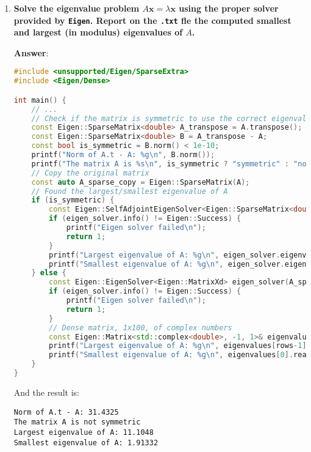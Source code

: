\begin{enumerate}[label=\textcolor{Green3}{\textbf{\arabic*.}}]
    \newpage

    \item \textcolor{Green3}{\textbf{%
        Solve the eigenvalue problem $A\mathbf{x} = \lambda\mathbf{x}$ using the proper solver provided by \texttt{Eigen}. Report on the \texttt{.txt} fle the computed smallest and largest (in modulus) eigenvalues of $A$.
    }}

    \textbf{Answer}:
    \begin{lstlisting}[language=C++]
#include <unsupported/Eigen/SparseExtra>
#include <Eigen/Dense>

int main() {
    // ...
    // Check if the matrix is symmetric to use the correct eigenvalue solver
    const Eigen::SparseMatrix<double> A_transpose = A.transpose();
    const Eigen::SparseMatrix<double> B = A_transpose - A;
    const bool is_symmetric = B.norm() < 1e-10;
    printf("Norm of A.t - A: %g\n", B.norm());
    printf("The matrix A is %s\n", is_symmetric ? "symmetric" : "not symmetric");
    // Copy the original matrix
    const auto A_sparse_copy = Eigen::SparseMatrix(A);
    // Found the largest/smallest eigenvalue of A
    if (is_symmetric) {
        const Eigen::SelfAdjointEigenSolver<Eigen::SparseMatrix<double>> eigen_solver(A_sparse_copy);
        if (eigen_solver.info() != Eigen::Success) {
            printf("Eigen solver failed\n");
            return 1;
        }
        printf("Largest eigenvalue of A: %g\n", eigen_solver.eigenvalues()[rows-1]);
        printf("Smallest eigenvalue of A: %g\n", eigen_solver.eigenvalues()[0]);
    } else {
        const Eigen::EigenSolver<Eigen::MatrixXd> eigen_solver(A_sparse_copy.toDense());
        if (eigen_solver.info() != Eigen::Success) {
            printf("Eigen solver failed\n");
            return 1;
        }
        // Dense matrix, 1x100, of complex numbers
        const Eigen::Matrix<std::complex<double>, -1, 1>& eigenvalues = eigen_solver.eigenvalues();
        printf("Largest eigenvalue of A: %g\n", eigenvalues[rows-1].real());
        printf("Smallest eigenvalue of A: %g\n", eigenvalues[0].real());
    }
}\end{lstlisting}
    And the result is:
    \begin{lstlisting}
Norm of A.t - A: 31.4325
The matrix A is not symmetric
Largest eigenvalue of A: 11.1048
Smallest eigenvalue of A: 1.91332\end{lstlisting}


    \newpage


\end{enumerate}
